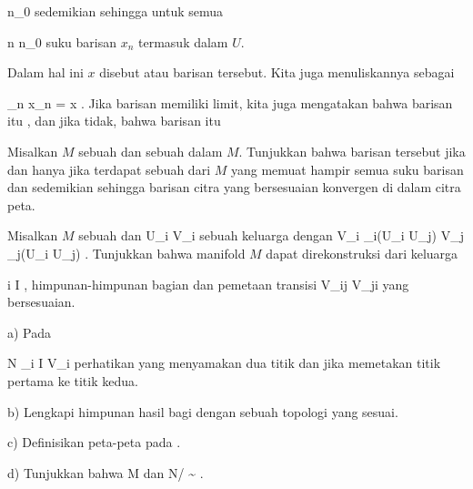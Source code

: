 \mavergleichskette
{\vergleichskette
{ n_0
}
{ \in }{ \N
}
{  }{
}
{    }{
}
{   }{
}
}
{}{}{}
sedemikian sehingga untuk semua

\mavergleichskette
{\vergleichskette
{ n
}
{ \geq }{ n_0
}
{  }{
}
{    }{
}
{   }{
}
}
{}{}{}
suku barisan $x_n$ termasuk dalam $U$.

Dalam hal ini $x$ disebut  atau  barisan tersebut. Kita juga menuliskannya sebagai

\mavergleichskettedisp
{\vergleichskette
{  \lim_{n \rightarrow \infty}  x_n
}
{ =} { x
}
{ } {
}
{ } {
}
{ } {
}
}
{}{}{.}
Jika barisan memiliki limit, kita juga mengatakan bahwa barisan itu 
 {} {,}
dan jika tidak, bahwa barisan itu 

{}
{

Misalkan $M$ sebuah
dan
 sebuah
dalam $M$. Tunjukkan bahwa barisan tersebut
jika dan hanya jika terdapat sebuah
dari $M$ yang memuat hampir semua suku barisan dan sedemikian sehingga barisan citra yang bersesuaian konvergen di dalam citra peta.

}
{} {}

{}
{

Misalkan $M$ sebuah
dan
 {U_i } { V_i
} {}
sebuah keluarga
dengan
 {V_i \cap \alpha_i(U_i \cap U_j) } { V_j \cap \alpha_j(U_i \cap U_j)
} {.}
Tunjukkan bahwa manifold $M$ dapat direkonstruksi dari keluarga

 {}
 {i \in I} {}
 {} {} {} {,}
himpunan-himpunan bagian
 dan pemetaan transisi
 {V_{ij}} { V_{ji}
} {}
yang bersesuaian.

a) Pada

\mavergleichskettedisp
{\vergleichskette
{N
}
{ } { \biguplus_{i \in I} V_i
}
{ } {
}
{ } {
}
{ } {
}
}
{}{}{}
perhatikan
yang menyamakan dua titik
 dan
 jika
 memetakan titik pertama ke titik kedua.

b) Lengkapi himpunan hasil bagi
 dengan sebuah topologi yang sesuai.

c) Definisikan peta-peta pada
.

d) Tunjukkan bahwa
\mathkor {} {M} {dan} {N/ \sim} {}
.

}
{} {}

